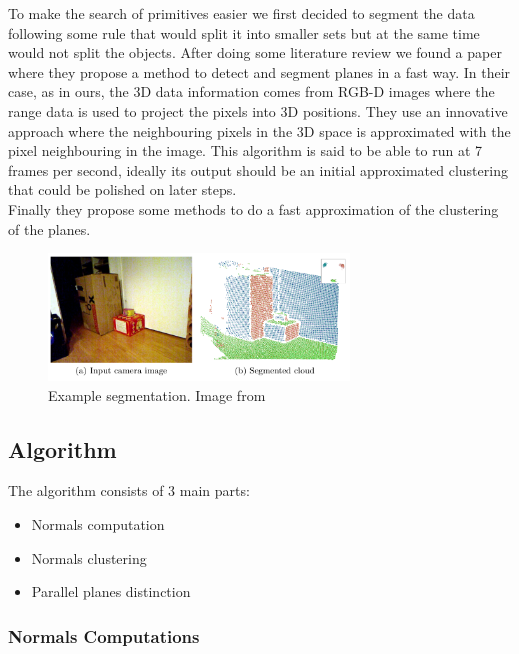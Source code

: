 \documentclass[fontsize=12pt]{article}
\begin{document}
To make the search of primitives easier we first decided to segment the data following some rule that would split it into smaller sets but at the same time would not split the objects. After doing some literature review we found a paper \cite{bib:planes_paper} where they propose a method to detect and segment planes in a fast way. In their case, as in ours, the 3D data information comes from RGB-D images where the range data is used to project the pixels into 3D positions. They use an innovative approach where the neighbouring pixels in the 3D space is approximated with the pixel neighbouring in the image. This algorithm is said to be able to run at 7 frames per second, ideally its output should be an initial approximated clustering that could be polished on later steps.\\

Finally they propose some methods to do a fast approximation of the clustering of the planes.\\

\begin{figure}[!htbp]
  \begin{center}
    \includegraphics[width=8cm]{./images/segmentation_result.png}
    \caption{Example segmentation. Image from \cite{bib:planes_paper}}
    \label{fig:example_segmentation}
  \end{center}
\end{figure}

\subsection{Algorithm}
\label{sub:plane_algorithm}

The algorithm consists of 3 main parts:

\begin{itemize}
  \item Normals computation
  \item Normals clustering
  \item Parallel planes distinction
\end{itemize}




\subsubsection{Normals Computations}
\end{document}
